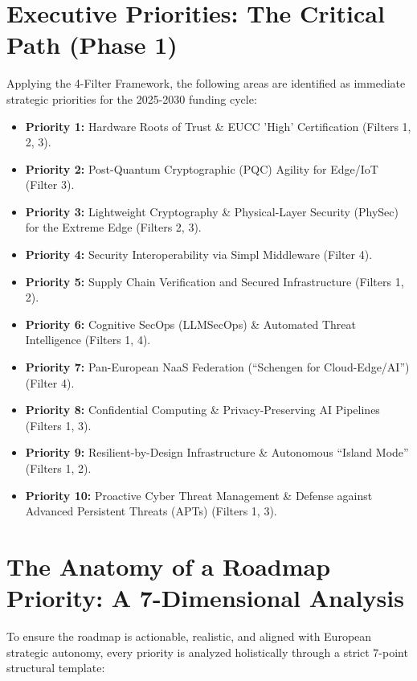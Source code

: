 \documentclass[12pt,a4paper]{report}
\begin{document}
\section*{Executive Priorities: The Critical Path (Phase 1)}
Applying the 4-Filter Framework, the following areas are identified as immediate strategic priorities for the 2025-2030 funding cycle:
\begin{itemize}
    \item \textbf{Priority 1:} Hardware Roots of Trust \& EUCC 'High' Certification (Filters 1, 2, 3).
    \item \textbf{Priority 2:} Post-Quantum Cryptographic (PQC) Agility for Edge/IoT (Filter 3).
    \item \textbf{Priority 3:} Lightweight Cryptography \& Physical-Layer Security (PhySec) for the Extreme Edge (Filters 2, 3).
    \item \textbf{Priority 4:} Security Interoperability via Simpl Middleware (Filter 4).
    \item \textbf{Priority 5:} Supply Chain Verification and Secured Infrastructure (Filters 1, 2).
    \item \textbf{Priority 6:} Cognitive SecOps (LLMSecOps) \& Automated Threat Intelligence (Filters 1, 4).
    \item \textbf{Priority 7:} Pan-European NaaS Federation (``Schengen for Cloud-Edge/AI'') (Filter 4).
    \item \textbf{Priority 8:} Confidential Computing \& Privacy-Preserving AI Pipelines (Filters 1, 3).
    \item \textbf{Priority 9:} Resilient-by-Design Infrastructure \& Autonomous ``Island Mode'' (Filters 1, 2).
    \item \textbf{Priority 10:} Proactive Cyber Threat Management \& Defense against Advanced Persistent Threats (APTs) (Filters 1, 3).
\end{itemize}

\section{The Anatomy of a Roadmap Priority: A 7-Dimensional Analysis}
To ensure the roadmap is actionable, realistic, and aligned with European strategic autonomy, every priority is analyzed holistically through a strict 7-point structural template:
\end{document}
